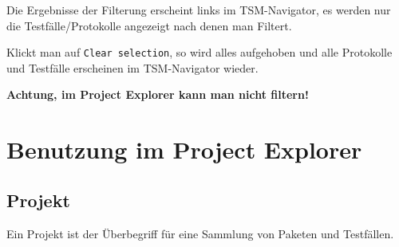 \documentclass[11pt,a4paper,titlepage]{article}
\begin{document}
Die Ergebnisse der Filterung erscheint links im TSM-Navigator, es werden nur die Testfälle/Protokolle angezeigt nach denen man Filtert.

Klickt man auf \texttt{Clear selection}, so wird alles aufgehoben und alle Protokolle und Testfälle erscheinen im TSM-Navigator wieder.

\textbf{Achtung, im Project Explorer kann man nicht filtern!}

\newpage
\section{Benutzung im Project Explorer}
\subsection{Projekt}
Ein Projekt ist der Überbegriff für eine Sammlung von Paketen und Testfällen.
\end{document}
